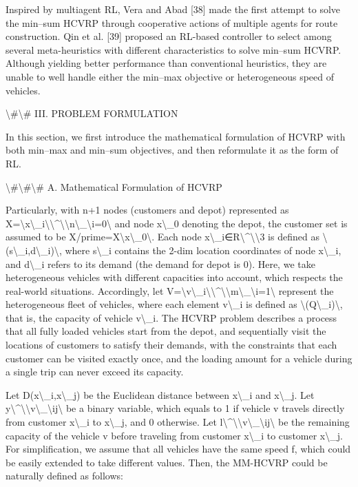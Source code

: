 \documentclass{article}
\begin{document}
	Inspired by multiagent RL, Vera and Abad [38] made the first attempt to solve the min–sum HCVRP through cooperative actions of multiple agents for route construction. Qin et al. [39] proposed an RL-based controller to select among several meta-heuristics with different characteristics to solve min–sum HCVRP. Although yielding better performance than conventional heuristics, they are unable to well handle either the min–max objective or heterogeneous speed of vehicles.
	
	\textbackslash{}#\textbackslash{}# III. PROBLEM FORMULATION
	
	In this section, we first introduce the mathematical formulation of HCVRP with both min–max and min–sum objectives, and then reformulate it as the form of RL.
	
	\textbackslash{}#\textbackslash{}#\textbackslash{}# A. Mathematical Formulation of HCVRP
	
	Particularly, with n+1 nodes (customers and depot) represented as X=\textbackslash{}{x\textbackslash{}_i\textbackslash{}}\textbackslash{}^\textbackslash{}{\textbackslash{}}n\textbackslash{}_\textbackslash{}{i=0\textbackslash{}} and node x\textbackslash{}_0 denoting the depot, the customer set is assumed to be X/prime=X\textbackslash{}{x\textbackslash{}_0\textbackslash{}}. Each node x\textbackslash{}_i∈R\textbackslash{}^\textbackslash{}{\textbackslash{}}3 is defined as \textbackslash{}{(s\textbackslash{}_i,d\textbackslash{}_i)\textbackslash{}}, where s\textbackslash{}_i contains the 2-dim location coordinates of node x\textbackslash{}_i, and d\textbackslash{}_i refers to its demand (the demand for depot is 0). Here, we take heterogeneous vehicles with different capacities into account, which respects the real-world situations. Accordingly, let V=\textbackslash{}{v\textbackslash{}_i\textbackslash{}}\textbackslash{}^\textbackslash{}{\textbackslash{}}m\textbackslash{}_\textbackslash{}{i=1\textbackslash{}} represent the heterogeneous fleet of vehicles, where each element v\textbackslash{}_i is defined as \textbackslash{}{(Q\textbackslash{}_i)\textbackslash{}}, that is, the capacity of vehicle v\textbackslash{}_i. The HCVRP problem describes a process that all fully loaded vehicles start from the depot, and sequentially visit the locations of customers to satisfy their demands, with the constraints that each customer can be visited exactly once, and the loading amount for a vehicle during a single trip can never exceed its capacity.
	
	Let D(x\textbackslash{}_i,x\textbackslash{}_j) be the Euclidean distance between x\textbackslash{}_i and x\textbackslash{}_j. Let y\textbackslash{}^\textbackslash{}{\textbackslash{}}v\textbackslash{}_\textbackslash{}{ij\textbackslash{}} be a binary variable, which equals to 1 if vehicle v travels directly from customer x\textbackslash{}_i to x\textbackslash{}_j, and 0 otherwise. Let l\textbackslash{}^\textbackslash{}{\textbackslash{}}v\textbackslash{}_\textbackslash{}{ij\textbackslash{}} be the remaining capacity of the vehicle v before traveling from customer x\textbackslash{}_i to customer x\textbackslash{}_j. For simplification, we assume that all vehicles have the same speed f, which could be easily extended to take different values. Then, the MM-HCVRP could be naturally defined as follows:
	
\end{document}
